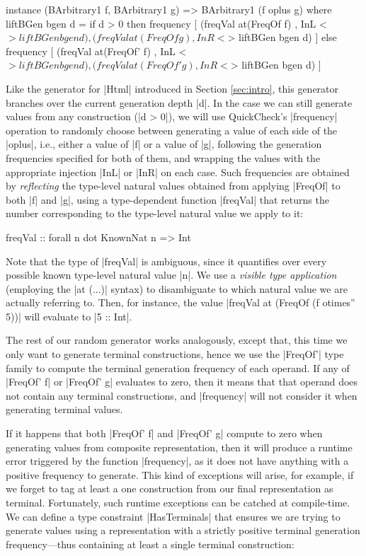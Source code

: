 \begin{code}
instance (BArbitrary1 f, BArbitrary1 g)
  => BArbitrary1 (f oplus g) where
  liftBGen bgen d =
    if d > 0
    then frequency
      [ (freqVal  at(FreqOf f) ,  InL <$> liftBGen bgen d)
      , (freqVal  at(FreqOf g) ,  InR <$> liftBGen bgen d) ]
    else frequency
      [ (freqVal  at(FreqOf' f) ,  InL <$> liftBGen bgen d)
      , (freqVal  at(FreqOf' g) ,  InR <$> liftBGen bgen d) ]
\end{code}
%
Like the generator for |Html| introduced in Section \ref{sec:intro}, this
generator branches over the current generation depth |d|.
%
In the case we can still generate values from any construction (|d > 0|), we
will use QuickCheck's |frequency| operation to randomly choose between
generating a value of each side of the |oplus|, i.e., either a value of |f| or a
value of |g|, following the generation frequencies specified for both of them,
and wrapping the values with the appropriate injection |InL| or |InR| on each
case.
%
Such frequencies are obtained by \emph{reflecting} the type-level natural values
obtained from applying |FreqOf| to both |f| and |g|, using a type-dependent
function |freqVal| that returns the number corresponding to the type-level
natural value we apply to it:

\begin{code}
freqVal :: forall n dot KnownNat n => Int
\end{code}
%
Note that the type of |freqVal| is ambiguous, since it quantifies over every
possible known type-level natural value |n|.
%
We use a \emph{visible type application} (employing the |at (...)| syntax) to
disambiguate to which natural value we are actually referring to.
%
Then, for instance, the value |freqVal at (FreqOf (f otimes'' 5))| will evaluate
to |5 :: Int|.


The rest of our random generator works analogously, except that, this time we
only want to generate terminal constructions, hence we use the |FreqOf'| type
family to compute the terminal generation frequency of each operand.
%
If any of |FreqOf' f| or |FreqOf' g| evaluates to zero, then it means that that
operand does not contain any terminal constructions, and |frequency| will not
consider it when generating terminal values.


If it happens that both |FreqOf' f| and |FreqOf' g| compute to zero when
generating values from composite representation, then it will produce a runtime
error triggered by the function |frequency|, as it does not have anything with a
positive frequency to generate.
%
This kind of exceptions will arise, for example, if we forget to tag at least a
one construction from our final representation as terminal.
%
Fortunately, such runtime exceptions can be catched at compile-time.
%
We can define a type constraint |HasTerminals| that ensures we are trying to
generate values using a representation with a strictly positive terminal
generation frequency---thus containing at least a single terminal construction:


